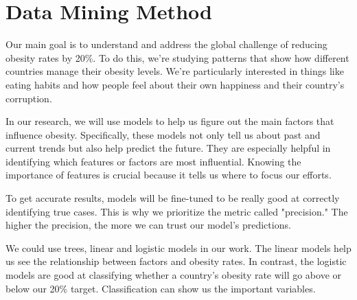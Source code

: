 \part{Data Mining Method}


    Our main goal is to understand and address the global challenge of reducing obesity rates by 20\%. To do this, we're studying patterns that show how different countries manage their obesity levels. We're particularly interested in things like eating habits and how people feel about their own happiness and their country's corruption.

    In our research, we will use models to help us figure out the main factors that influence obesity. Specifically, these models not only tell us about past and current trends but also help predict the future. They are especially helpful in identifying which features or factors are most influential. Knowing the importance of features is crucial because it tells us where to focus our efforts.

    To get accurate results, models will be fine-tuned to be really good at correctly identifying true cases. This is why we prioritize the metric called "precision." The higher the precision, the more we can trust our model's predictions.

    We could use trees, linear and logistic models in our work. The linear models help us see the relationship between factors and obesity rates. In contrast, the logistic models are good at classifying whether a country's obesity rate will go above or below our 20\% target. Classification can show us the important variables.

